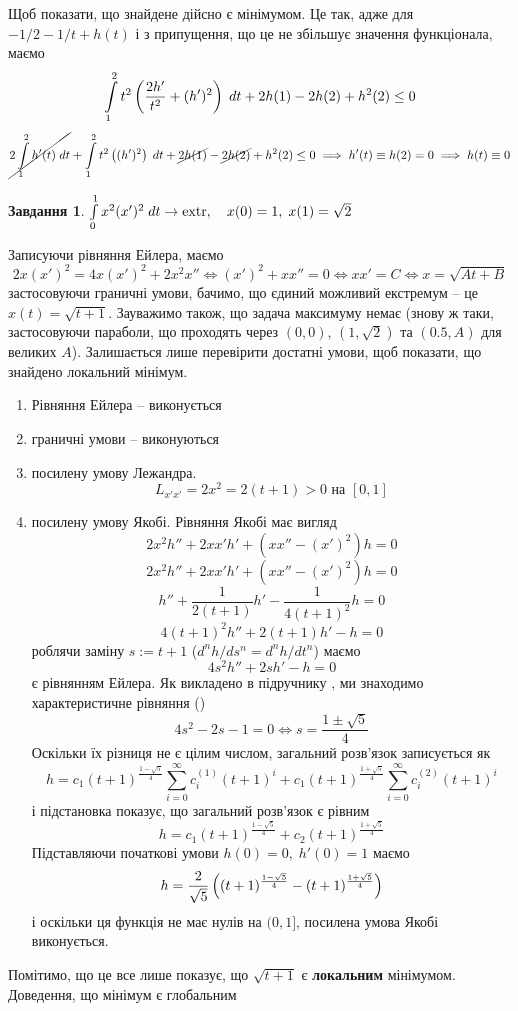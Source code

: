 \documentclass[12pt]{article} %
\newtheorem{prob}{Завдання}
\newcommand{\dt}{\;dt}
\let\oldint\int
\renewcommand{\int}{\oldint\limits}
\newcommand{\extr}{\mbox{\normalfont extr}}
\begin{document}
Щоб показати, що знайдене дійсно є мінімумом. Це так, адже для $-1/2-1/t+h(t)$ і з припущення, що це не збільшує значення функціонала, маємо
\[\int_1^2t^2\mybra{\frac{2h'}{t^2}+(h')^2}\dt+2h(1)-2h(2)+h^2(2)\leq0\]
\[\cancel{2\int_1^2h'(t)\dt}+\int_1^2t^2\mybra{(h')^2}\dt+\cancel{2h(1)}-\cancel{2h(2)}+h^2(2)\leq0\implies h'(t)\equiv h(2)=0\implies h(t)\equiv0\]
\begin{prob}{}\; $\int_0^1x^2(x')^2\dt\to\extr,\quad x(0)=1,\;x(1)=\sqrt{2}$\end{prob}
	Записуючи рівняння Ейлера, маємо
	\[2x(x')^2=4x(x')^2+2x^2x''\iff (x')^2+xx''=0\iff xx'=C\iff x=\sqrt{At+B}\]
	застосовуючи граничні умови, бачимо, що єдиний можливий екстремум -- це $x(t)=\sqrt{t+1}$. Зауважимо також, що задача
	максимуму немає (знову ж таки, застосовуючи параболи, що проходять через $(0,0)$, $(1,\sqrt{2})$ та $(0.5,A)$ для великих $A$). Залишається
	лише перевірити достатні умови, щоб показати, що знайдено локальний мінімум.
	\begin{enumerate}
		\item Рівняння Ейлера -- виконується
		\item граничні умови -- виконуються
		\item посилену умову Лежандра.
			\[L_{x'x'}=2x^2=2(t+1)>0\mbox{ на }[0,1]\]
		\item посилену умову Якобі. Рівняння Якобі має вигляд
			\[2x^2h''+2xx'h'+(xx''-(x')^2)h=0\]
			\[2x^2h''+2xx'h'+(xx''-(x')^2)h=0\]
			\[h''+\frac{1}{2(t+1)}h'-\frac{1}{4(t+1)^2}h=0\]
			\[4(t+1)^2h''+2(t+1)h'-h=0\]
			роблячи заміну $s:=t+1$ ($d^nh/ds^n=d^nh/dt^n$) маємо 
			\[4s^2h''+2sh'-h=0\]
			є рівнянням Ейлера. Як викладено в підручнику \cite[с. 290]{samoilenko}, ми знаходимо характеристичне
			рівняння (\cite[(3.28)]{samoilenko})
			\[4s^2-2s-1=0\iff s=\frac{1\pm\sqrt{5}}{4}\]
			Оскільки їх різниця не є цілим числом, загальний розв’язок записується як
			\[h=c_1(t+1)^{\frac{1-\sqrt{5}}{4}}\sum_{i=0}^\infty c^{(1)}_i(t+1)^i+
			c_1(t+1)^{\frac{1+\sqrt{5}}{4}}\sum_{i=0}^\infty c^{(2)}_i(t+1)^i\]
			і підстановка показує, що загальний розв’язок є рівним
			\[h=c_1(t+1)^{\frac{1-\sqrt{5}}{4}}+c_2(t+1)^{\frac{1+\sqrt{5}}{4}}\]
			Підставляючи початкові умови $h(0)=0,\;h'(0)=1$ маємо
			\[h=\frac{2}{\sqrt{5}}\left((t+1)^{\frac{1-\sqrt{5}}{4}}-(t+1)^{\frac{1+\sqrt{5}}{4}}\right)\]
			і оскільки ця функція не має нулів на $(0,1]$, посилена умова Якобі виконується.
	\end{enumerate}
	Помітимо, що це все лише показує, що $\sqrt{t+1}$ є \textbf{локальним} мінімумом. Доведення, що мінімум є глобальним
\end{document}
